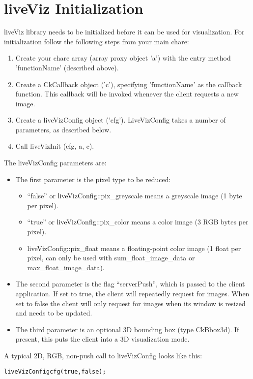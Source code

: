 \section{liveViz Initialization}

liveViz library needs to be initialized before it can be used for 
visualization. For initialization follow the following steps
from your main chare:

\begin{enumerate}
\item Create your chare array (array proxy object 'a') with the entry 
      method 'functionName' (described above).
\item Create a CkCallback object ('c'), specifying 'functionName' as the 
      callback function.  This callback will be invoked whenever the
      client requests a new image.
\item Create a liveVizConfig object ('cfg').  LiveVizConfig takes a number
     of parameters, as described below.
\item Call liveVizInit (cfg, a, c).
\end{enumerate}

The liveVizConfig parameters are:
\begin{itemize}
  \item The first parameter is the pixel type to be reduced:
     \begin{itemize}
       \item ``false'' or liveVizConfig::pix\_greyscale means a greyscale image (1 byte per pixel).
       \item ``true'' or liveVizConfig::pix\_color means a color image (3 RGB bytes per pixel).
       \item liveVizConfig::pix\_float means a floating-point color image (1 float per pixel, can only be used with sum\_float\_image\_data or max\_float\_image\_data).
     \end{itemize}
   \item The second parameter is the flag ``serverPush'', which is passed to the client application. If set to true, the client will repeatedly request for images. When set to false the client will only request for images when its window is resized and needs to be updated.     
   \item The third parameter is an optional 3D bounding box (type CkBbox3d).  If present, this puts the client into a 3D visualization mode.
\end{itemize}

A typical 2D, RGB, non-push call to liveVizConfig looks like this:
\begin{alltt}
   liveVizConfig cfg(true,false);
\end{alltt}

